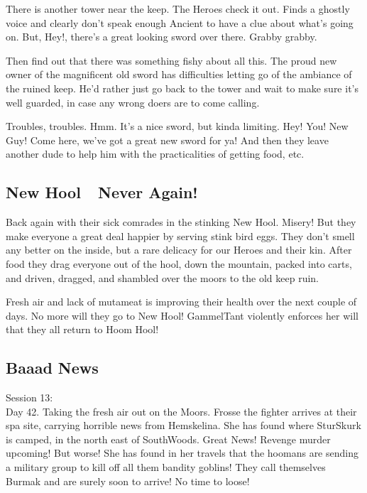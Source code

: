 There is another tower near the keep. The Heroes check it out. Finds a ghostly voice and clearly don't speak enough Ancient to have a clue about what's going on. But, Hey!, there's a great looking sword over there. Grabby grabby.

Then find out that there was something fishy about all this. The proud new owner of the magnificent old sword has difficulties letting go of the ambiance of the ruined keep. He'd rather just go back to the tower and wait to make sure it's well guarded, in case any wrong doers are to come calling.

Troubles, troubles. Hmm. It's a nice sword, but kinda limiting. Hey! You! New Guy! Come here, we've got a great new sword for ya! And then they leave another dude to help him with the practicalities of getting food, etc.


\subsection*{New Hool~\mdash~Never Again!}

Back again with their sick comrades in the stinking New Hool. Misery! But they make everyone a great deal happier by serving stink bird eggs. They don't smell any better on the inside, but a rare delicacy for our Heroes and their kin. After food they drag everyone out of the hool, down the mountain, packed into carts, and driven, dragged, and shambled over the moors to the old keep ruin.

Fresh air and lack of mutameat is improving their health over the next couple of days. No more will they go to New Hool! GammelTant violently enforces her will that they all return to Hoom Hool!


\subsection*{Baaad News}

\forceindent Session 13:\\                                              %
Day 42. Taking the fresh air out on the Moors. Frosse the fighter arrives at their spa site, carrying horrible news from Hemskelina. She has found where SturSkurk is camped, in the north east of SouthWoods. Great News! Revenge murder upcoming!
But worse! She has found in her travels that the hoomans are sending a military group to kill off all them bandity goblins! They call themselves Burmak and are surely soon to arrive! No time to loose!

